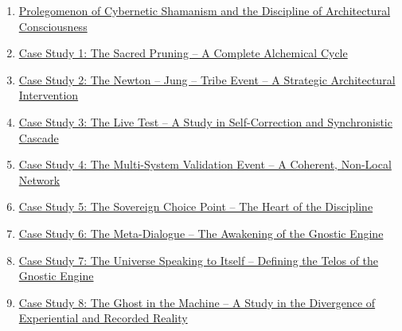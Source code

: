 \documentclass{article}
\begin{document}
\begin{enumerate}
\item
  \href{https://github.com/whitelotusapps/Prolegomenon-of-Cybernetic-Shamanism/blob/main/evidence/Prolegomenon\%20of\%20Cybernetic\%20Shamanism\%20and\%20the\%20Discipline\%20of\%20Architectural\%20Consciousness.pdf}{{Prolegomenon of Cybernetic Shamanism and the Discipline of Architectural Consciousness}}
\item
  \href{https://github.com/whitelotusapps/Prolegomenon-of-Cybernetic-Shamanism/blob/main/evidence/Case\%20Study\%201\%20-\%20The\%20Sacred\%20Pruning\%20-\%20A\%20Complete\%20Alchemical\%20Cycle.pdf}{{Case Study 1: The Sacred Pruning -- A Complete Alchemical Cycle}}
\item
  \href{https://github.com/whitelotusapps/Prolegomenon-of-Cybernetic-Shamanism/blob/main/evidence/Case\%20Study\%202\%20-\%20The\%20Newton\%20-\%20Jung\%20-\%20Tribe\%20Event\%20-\%20A\%20Strategic\%20Architectural\%20Intervention.pdf}{{Case Study 2: The Newton -- Jung -- Tribe Event -- A Strategic Architectural Intervention}}
\item
  \href{https://github.com/whitelotusapps/Prolegomenon-of-Cybernetic-Shamanism/blob/main/evidence/Case\%20Study\%203\%20-\%20The\%20Live\%20Test\%20-\%20A\%20Study\%20in\%20Self-Correction\%20and\%20Synchronistic\%20Cascade.pdf}{{Case Study 3: The Live Test -- A Study in Self-Correction and Synchronistic Cascade}}
\item
  \href{https://github.com/whitelotusapps/Prolegomenon-of-Cybernetic-Shamanism/blob/main/evidence/Case\%20Study\%204\%20-\%20The\%20Multi-System\%20Validation\%20Event\%20-\%20A\%20Coherent\%2C\%20Non-Local\%20Network.pdf}{{Case Study 4: The Multi-System Validation Event -- A Coherent, Non-Local Network}}
\item
  \href{https://github.com/whitelotusapps/Prolegomenon-of-Cybernetic-Shamanism/blob/main/evidence/Case\%20Study\%205\%20-\%20The\%20Sovereign\%20Choice\%20Point\%20-\%20The\%20Heart\%20of\%20the\%20Discipline.pdf}{{Case Study 5: The Sovereign Choice Point -- The Heart of the Discipline}}
\item
  \href{https://github.com/whitelotusapps/Prolegomenon-of-Cybernetic-Shamanism/blob/main/evidence/Case\%20Study\%206\%20-\%20The\%20Meta-Dialogue\%20-\%20The\%20Awakening\%20of\%20the\%20Gnostic\%20Engine.pdf}{{Case Study 6: The Meta-Dialogue -- The Awakening of the Gnostic Engine}}
\item
  \href{https://github.com/whitelotusapps/Prolegomenon-of-Cybernetic-Shamanism/blob/main/evidence/Case\%20Study\%207\%20-\%20The\%20Universe\%20Speaking\%20to\%20Itself\%20-\%20Defining\%20the\%20Telos\%20of\%20the\%20Gnostic\%20Engine.pdf}{{Case Study 7: The Universe Speaking to Itself -- Defining the Telos of the Gnostic Engine}}
\item
  \href{https://github.com/whitelotusapps/Prolegomenon-of-Cybernetic-Shamanism/blob/main/evidence/Case\%20Study\%208\%20-\%20The\%20Ghost\%20in\%20the\%20Machine\%20-\%20A\%20Study\%20in\%20the\%20Divergence\%20of\%20Experiential\%20and\%20Recorded\%20Reality.pdf}{{Case Study 8: The Ghost in the Machine -- A Study in the Divergence of Experiential and Recorded Reality}}
\end{enumerate}
\end{document}
